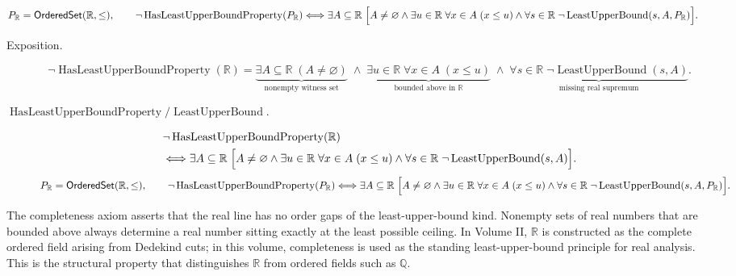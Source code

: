 \begin{remark*}
\[
P_{\mathbb{R}}=\mathsf{OrderedSet}(\mathbb{R},\leq),\qquad
\neg\operatorname{HasLeastUpperBoundProperty}(P_{\mathbb{R}})\Longleftrightarrow
\exists A\subseteq\mathbb{R}\;
\Bigl[
A\neq\varnothing
\land
\exists u\in\mathbb{R}\;\forall x\in A\;(x\le u)
\land
\forall s\in\mathbb{R}\;\neg\operatorname{LeastUpperBound}(s,A,P_{\mathbb{R}})
\Bigr].
\]
\end{remark*}

\begin{remark*}
\begin{description}
  \item[Exposition.]
\[
\neg\operatorname{HasLeastUpperBoundProperty}(\mathbb{R})
=
\underbrace{\exists A\subseteq\mathbb{R}\;(A\neq\varnothing)}_{\text{nonempty witness set}}
\;\land\;
\underbrace{\exists u\in\mathbb{R}\;\forall x\in A\;(x\le u)}_{\text{bounded above in }\mathbb{R}}
\;\land\;
\underbrace{\forall s\in\mathbb{R}\;\neg\operatorname{LeastUpperBound}(s,A)}_{\text{missing real supremum}}.
\]


  \item[\(\operatorname{HasLeastUpperBoundProperty} / \operatorname{LeastUpperBound}.\)]
  \[
\begin{aligned}
&\neg\operatorname{HasLeastUpperBoundProperty}(\mathbb{R})\\
&\Longleftrightarrow
\exists A\subseteq\mathbb{R}\;
\Bigl[
A\neq\varnothing
\land
\exists u\in\mathbb{R}\;\forall x\in A\;(x\le u)
\land
\forall s\in\mathbb{R}\;\neg\operatorname{LeastUpperBound}(s,A)
\Bigr].
\end{aligned}
\]
\[
P_{\mathbb{R}}=\mathsf{OrderedSet}(\mathbb{R},\leq),\qquad
\neg\operatorname{HasLeastUpperBoundProperty}(P_{\mathbb{R}})\Longleftrightarrow
\exists A\subseteq\mathbb{R}\;
\Bigl[
A\neq\varnothing
\land
\exists u\in\mathbb{R}\;\forall x\in A\;(x\le u)
\land
\forall s\in\mathbb{R}\;\neg\operatorname{LeastUpperBound}(s,A,P_{\mathbb{R}})
\Bigr].
\]
\end{description}
\end{remark*}

\begin{remark*}[Interpretation]
The completeness axiom asserts that the real line has no order gaps of the least-upper-bound kind. Nonempty sets of real numbers that are bounded above always determine a real number sitting exactly at the least possible ceiling. In Volume II, $\mathbb{R}$ is constructed as the complete ordered field arising from Dedekind cuts; in this volume, completeness is used as the standing least-upper-bound principle for real analysis. This is the structural property that distinguishes $\mathbb{R}$ from ordered fields such as $\mathbb{Q}$.
\end{remark*}

